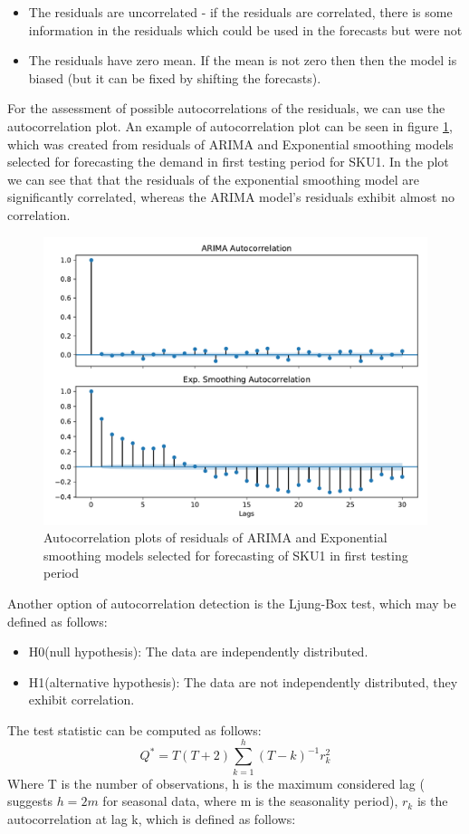 \documentclass[11pt,a4paper]{article}
\begin{document}
\begin{itemize}
\item The residuals are uncorrelated - if the residuals are correlated, there is some information in the residuals which could be used in the forecasts but were not
\item The residuals have zero mean. If the mean is not zero then then the model is biased (but it can be fixed by shifting the forecasts).
\end{itemize}

For the assessment of possible autocorrelations of the residuals, we can use the autocorrelation plot.  An example of autocorrelation plot can be seen in figure \ref{fig:resid_acf}, which was created from residuals of ARIMA and Exponential smoothing models selected for forecasting the demand in first testing period for SKU1. In the plot we can see that that the residuals of the exponential smoothing model are significantly correlated, whereas the ARIMA model's residuals exhibit almost no correlation.
\begin{figure}
  \includegraphics[width=1\linewidth]{figures/autocorrelation.pdf}
  \caption{Autocorrelation plots of residuals of ARIMA and Exponential smoothing models selected for forecasting of SKU1 in first testing period}
  \label{fig:resid_acf}
\end{figure}

Another option of autocorrelation detection is the Ljung-Box test, which may be defined as follows:
\begin{itemize}
\item H0(null hypothesis): The data are independently distributed. 
\item H1(alternative hypothesis): The data are not independently distributed, they exhibit correlation.
\end{itemize}
The test statistic can be computed as follows:
\begin{equation}
Q^* = T(T+2) \sum\limits_{k=1}^h{ (T-k)^{-1} r_k^2}
\end{equation}
Where T is the number of observations, h is the maximum considered lag (\cite{hyndman2014forecasting} suggests $h = 2m$ for seasonal data, where m is the seasonality period), $r_k$ is the autocorrelation at lag k, which is defined as follows:
\end{document}
